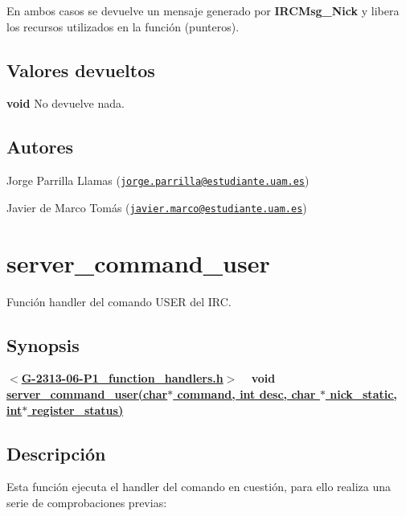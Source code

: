 En ambos casos se devuelve un mensaje generado por {\bfseries I\+R\+C\+Msg\+\_\+\+Nick} y libera los recursos utilizados en la función (punteros). \hypertarget{server_command_nick_return_nick}{}\subsection{Valores devueltos}\label{server_command_nick_return_nick}

\begin{DoxyItemize}
\item {\bfseries void} No devuelve nada. 
\end{DoxyItemize}\hypertarget{server_command_nick_authors_nick}{}\subsection{Autores}\label{server_command_nick_authors_nick}

\begin{DoxyItemize}
\item Jorge Parrilla Llamas (\href{mailto:jorge.parrilla@estudiante.uam.es}{\tt jorge.\+parrilla@estudiante.\+uam.\+es}) 
\item Javier de Marco Tomás (\href{mailto:javier.marco@estudiante.uam.es}{\tt javier.\+marco@estudiante.\+uam.\+es}) 
\end{DoxyItemize}\hypertarget{server_command_user}{}\section{server\+\_\+command\+\_\+user}\label{server_command_user}
Función handler del comando U\+S\+E\+R del I\+R\+C.\hypertarget{server_command_user_synopsis_user}{}\subsection{Synopsis}\label{server_command_user_synopsis_user}
{ {\bfseries $<$\hyperlink{G-2313-06-P1__function__handlers_8h}{G-\/2313-\/06-\/\+P1\+\_\+function\+\_\+handlers.\+h}$>$} ~\newline
 {\bfseries void \hyperlink{G-2313-06-P1__function__handlers_8c_ad09156d6bd4cf58f4345e0bf851ff099}{server\+\_\+command\+\_\+user(char$\ast$ command, int desc, char $\ast$ nick\+\_\+static, int$\ast$ register\+\_\+status)}} } \hypertarget{server_command_user_descripcion_user}{}\subsection{Descripción}\label{server_command_user_descripcion_user}
Esta función ejecuta el handler del comando en cuestión, para ello realiza una serie de comprobaciones previas\+:


